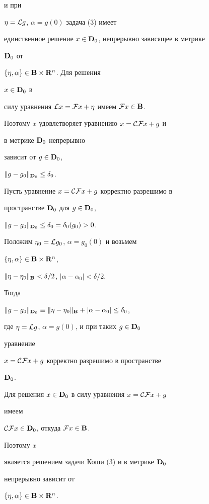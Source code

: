 \begin{pf}
и при


$\eta={\cal L}g$, $\alpha=g(0)$ задача (3) имеет


единственное решение $x\in\bold {D}_0$, непрерывно зависящее в метрике


$\bold {D}_0$ от


$\{\eta,\alpha\}\in\bold {B}\times\bold {R}^n$. Для решения


$x\in\bold {D}_0$ в


силу уравнения ${\cal L}x={\cal F}x+\eta$ имеем ${\cal


F}x\in\spc{B}$.


Поэтому $x$ удовлетворяет уравнению $x={\cal C}{\cal F}x+g$ и


в метрике $\bold {D}_0$ непрерывно


зависит от $g\in\bold {D}_0$,


$\|g-g_0\|_{\bold{D}_0}\le\delta_0$.





Пусть уравнение $x={\cal C}{\cal F}x+g$ корректно разрешимо в


пространстве $\bold {D}_0$ для $g\in\bold {D}_0$,


$\|g-g_0\|_{\bold{D}_0}\le\delta_0=\delta_0(g_0)>0$.


Положим $\eta_0={\cal L}g_0$, $\alpha=g_0(0)$ и возьмем


$\{\eta,\alpha\}\in\bold {B}\times\bold {R}^n$,


$\|\eta-\eta_0\|_{\bold B}<\delta/2$, $|\alpha-\alpha_0|<\delta/2$.


Тогда


$\|g-g_0\|_{\bold{D}_0}\equiv\|\eta-\eta_0\|_{\bold B}+


|\alpha-\alpha_0|\le\delta_0$,


где $\eta={\cal L}g$, $\alpha=g(0)$, и при таких $g\in\bold {D}_0$


уравнение


$x={\cal C}{\cal F}x+g$ корректно разрешимо в пространстве


$\bold {D}_0$.


Для решения $x\in\bold {D}_0$ в силу уравнения $x={\cal C}{\cal F}x+g$


имеем


${\cal C}{\cal F}x\in\bold {D}_0$, откуда ${\cal F}x\in\bold {B}$.


Поэтому $x$


является решением задачи Коши (3) и в метрике $\bold {D}_0$ 


непрерывно зависит от


$\{\eta,\alpha\}\in\bold {B}\times\bold {R}^n$.


\end{pf}





